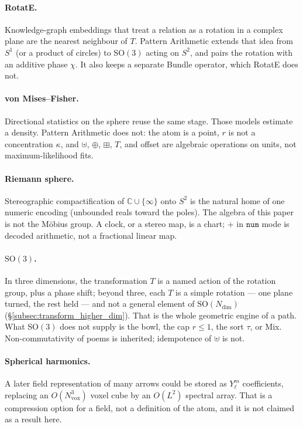 \documentclass[12pt, a4paper]{article}
\begin{document}
\paragraph{RotatE.}
Knowledge-graph embeddings that treat a relation as a rotation in a
complex plane are the nearest neighbour of $T$. Pattern Arithmetic
extends that idea from $S^1$ (or a product of circles) to
$\mathrm{SO}(3)$ acting on $S^2$, and pairs the rotation with an
additive phase $\chi$. It also keeps a separate Bundle operator,
which RotatE does not.

\paragraph{von Mises--Fisher.}
Directional statistics on the sphere reuse the same stage.
Those models estimate a density. Pattern Arithmetic does not: the atom
is a point, $r$ is not a concentration $\kappa$, and $\uplus$, $\oplus$, $\boxplus$, $T$, and
offset are algebraic operations on units, not maximum-likelihood fits.

\paragraph{Riemann sphere.}
Stereographic compactification of $\mathbb{C}\cup\{\infty\}$ onto $S^2$
is the natural home of one numeric encoding (unbounded reals toward the
poles). The algebra of this paper is not the M\"obius group. A clock,
or a stereo map, is a chart; $+$ in $\mathtt{num}$ mode is decoded
arithmetic, not a fractional linear map.

\paragraph{$\mathrm{SO}(3)$.}
In three dimensions, the transformation $T$ is a named action of the
rotation group, plus a phase shift; beyond three, each $T$ is a simple
rotation --- one plane turned, the rest held --- and not a general
element of $\mathrm{SO}(N_{\mathrm{dim}})$
(\S\ref{subsec:transform_higher_dim}). That is the whole geometric engine of a path. What
$\mathrm{SO}(3)$ does not supply is the bowl, the cap $r\le 1$, the
sort $\tau$, or Mix. Non-commutativity of poems is inherited;
idempotence of $\uplus$ is not.

\paragraph{Spherical harmonics.}
A later field representation of many arrows could be stored as
$Y_\ell^m$ coefficients, replacing an $O(N_{\mathrm{vox}}^3)$ voxel cube by an
$O(L^2)$ spectral array. That is a compression option for a field, not
a definition of the atom, and it is not claimed as a result here.
\end{document}
